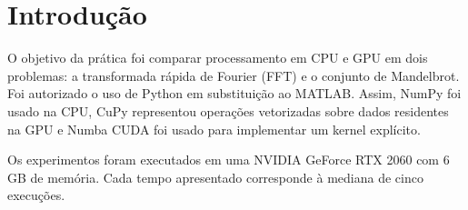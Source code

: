 \section{Introdução}

O objetivo da prática foi comparar processamento em CPU e GPU em dois
problemas: a transformada rápida de Fourier (FFT) e o conjunto de Mandelbrot.
Foi autorizado o uso de Python em substituição ao MATLAB. Assim, NumPy foi
usado na CPU, CuPy representou operações vetorizadas sobre dados residentes
na GPU e Numba CUDA foi usado para implementar um kernel explícito.

Os experimentos foram executados em uma NVIDIA GeForce RTX 2060 com 6 GB de
memória. Cada tempo apresentado corresponde à mediana de cinco execuções.

